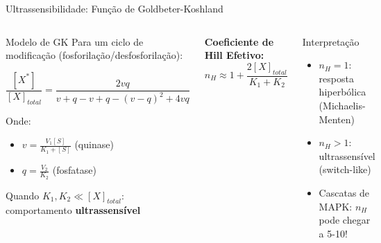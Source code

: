 \begin{frame}{Ultrassensibilidade: Função de Goldbeter-Koshland}
\begin{columns}
\begin{block}{Modelo de GK}
Para um ciclo de modificação (fosforilação/desfosforilação):

\begin{equation*}
\frac{[X^*]}{[X]_{total}} = \frac{2vq}{v + q - v + q - (v - q)^2 + 4vq}
\end{equation*}

Onde:
\begin{itemize}
    \item $v = \frac{V_1[S]}{K_1 + [S]}$ (quinase)
    \item $q = \frac{V_2}{K_2}$ (fosfatase)
\end{itemize}

Quando $K_1, K_2 \ll [X]_{total}$: comportamento \textbf{ultrassensível}
\end{block}

\textbf{Coeficiente de Hill Efetivo:}
\begin{equation*}
n_{H} \approx 1 + \frac{2[X]_{total}}{K_1 + K_2}
\end{equation*}

\vspace{0.3cm}

\begin{exampleblock}{Interpretação}
\begin{itemize}
    \item $n_H = 1$: resposta hiperbólica (Michaelis-Menten)
    \item $n_H > 1$: ultrassensível (switch-like)
    \item Cascatas de MAPK: $n_H$ pode chegar a 5-10!
\end{itemize}
\end{exampleblock}
\end{columns}

\vspace{0.3cm}

\end{frame}


